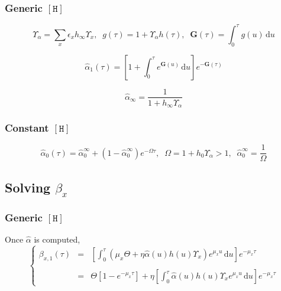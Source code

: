 \documentclass[aps,onecolumn,12pt]{revtex4}
\newcommand{\mychem}[1]{\mathtt{#1}}
\newcommand{\myconc}[1]{\left\lbrack{#1}\right\rbrack}
\newcommand{\spproton}{\mychem{H}}
\newcommand{\proton}{\myconc{\spproton}}
\newcommand{\ig}{\ensuremath{\mathbf{G}}}
\begin{document}
\subsubsection{Generic $\proton$}

\begin{equation}
	\Upsilon_\alpha = \sum_x \epsilon_x h_\infty \Upsilon_x,\;\;g(\tau) = 1+\Upsilon_\alpha h(\tau), \;\; \ig(\tau) = \int_0^\tau g(u) \, \mathrm{d} u
\end{equation}

\begin{equation}
	\hat\alpha_1(\tau) = \left[ 1 + \int_0^{\tau} e^{\ig(u)}\,\mathrm{d} u\right] e^{-\ig(\tau)}
\end{equation}

\begin{equation}
	\hat\alpha_\infty = \dfrac{1}{1+h_\infty \Upsilon_\alpha}
\end{equation}

\subsubsection{Constant $\proton$}
\begin{equation}
	\hat\alpha_0(\tau) = {\hat\alpha_0^\infty + \left(1-\hat\alpha_0^\infty\right) e^{-\Omega \tau} },
	\;\;\Omega=1+h_0\Upsilon_\alpha>1,
	\;\;\hat\alpha_0^\infty = \dfrac{1}{\Omega}
\end{equation}

\subsection{Solving $\beta_x$}

\subsubsection{Generic $\proton$}
Once $\hat\alpha$ is computed,
\begin{equation}
\left\lbrace
\begin{array}{rcl}
\beta_{x,1}(\tau) & = & \displaystyle \left[ \int_0^\tau \left( \mu_x \Theta + \eta \hat\alpha(u) h(u) \Upsilon_x \right)e^{\mu_x u} \, \mathrm{d} u \right] e^{-\mu_x\tau}\\
\\
& = & \displaystyle \Theta \left[ 1-e^{-\mu_x \tau}\right] + \eta \left[\int_0^\tau    \hat\alpha(u) h(u) \Upsilon_x  e^{\mu_x u} \, \mathrm{d} u\right] e^{-\mu_x \tau} 
\end{array}
\right.
\end{equation}
\end{document}
